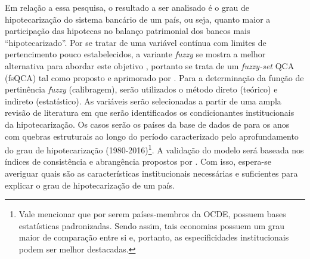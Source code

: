Em relação a essa pesquisa, o resultado a ser analisado é o grau de hipotecarização do sistema bancário de um país, ou seja, quanto maior a participação das hipotecas no balanço patrimonial dos bancos mais ``hipotecarizado''.
Por se tratar de uma variável contínua com limites de pertencimento pouco estabelecidos, a variante \textit{fuzzy} se mostra a melhor alternativa para abordar este objetivo \cite{zadeh_fuzzy_1965}, portanto se trata de um \textit{fuzzy-set} QCA (fsQCA) tal como proposto e aprimorado por \textcites{ragin_fuzzy-set_2000}{ragin_redesigning_2008}.
Para a determinação da função de pertinência \textit{fuzzy} (calibragem), serão utilizados o método direto (teórico) e indireto (estatístico).
As variáveis serão selecionadas a partir de uma ampla revisão de literatura em que serão identificados os condicionantes institucionais da hipotecarização.
Os casos serão os países da base de dados de \textcite{jorda_rate_2019} para os anos com quebras estruturais ao longo do período caracterizado pelo aprofundamento do grau de hipotecarização (1980-2016)\footnote{Vale mencionar que por serem países-membros da OCDE, possuem bases estatísticas padronizadas. Sendo assim, tais economias possuem um grau maior de comparação entre si e, portanto, as especificidades institucionais podem ser melhor destacadas.}.
A validação do modelo será baseada nos índices de consistência e abrangência propostos por \textcite{ragin_set_2006}.
Com isso, espera-se averiguar quais são as características institucionais necessárias e suficientes para explicar o grau de hipotecarização de um país.



